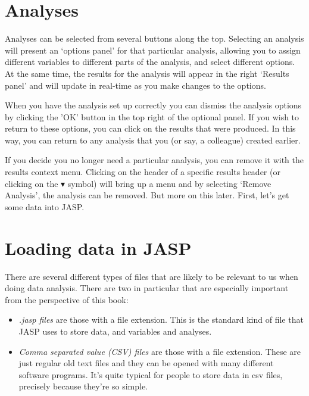 \section{Analyses\label{sec:analyses}}

Analyses can be selected from several buttons along the top. Selecting an analysis will present an ‘options panel’ for that particular analysis, allowing you to assign different variables to different parts of the analysis, and select different options. At the same time, the results for the analysis will appear in the right ‘Results panel’ and will update in real-time as you make changes to the options.

When you have the analysis set up correctly you can dismiss the analysis options by clicking the 'OK' button in the top right of the optional panel. If you wish to return to these options, you can click on the results that were produced. In this way, you can return to any analysis that you (or say, a colleague) created earlier.

If you decide you no longer need a particular analysis, you can remove it with the results context menu. Clicking on the header of a specific results header (or clicking on the $\blacktriangledown$ symbol) will bring up a menu and by selecting ‘Remove Analysis’, the analysis can be removed. But more on this later. First, let's get some data into JASP. %

\section{Loading data in JASP\label{sec:load}}

There are several different types of files that are likely to be relevant to us when doing data analysis. There are two in particular that are especially important from the perspective of this book:
\begin{itemize}
\item {\it .jasp files} are those with a  file extension. This is the standard kind of file that JASP uses to store data, and variables and analyses. 
\item {\it Comma separated value (CSV) files} are those with a  file extension. These are just regular old text files and they can be opened with many different software programs. It's quite typical for people to store data in csv files, precisely because they're so simple.
\end{itemize} 


